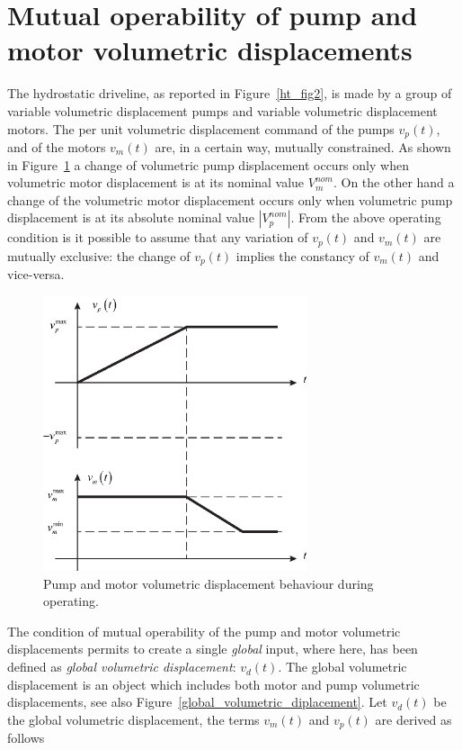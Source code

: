 \documentclass[11pt,a4paper,oneside]{book}
\numberwithin{equation}{section}
\newcommand{\abs}[1]{\left|#1\right|}
\theoremstyle{it}
\theoremstyle{definition}
\begin{document}
\section{Mutual operability of pump and motor volumetric displacements}\label{hds_theory_1}
\begin{multicols}{2}
	The hydrostatic driveline, as reported in Figure~\ref{ht_fig2}, is made by 
	a group of variable volumetric displacement pumps and variable volumetric 
	displacement motors. The per unit volumetric displacement command of the 
	pumps $v_p(t)$, and of the motors $v_m(t)$ are, in a certain way, mutually 
	constrained. As shown in Figure~\ref{ht_fig3} a change of volumetric pump 
	displacement occurs only when volumetric motor displacement is at its 
	nominal value $V_m^{nom}$. On the other hand a change of the volumetric 
	motor displacement occurs only when volumetric pump displacement is at its 
	absolute nominal value $\abs{V_p^{nom}}$. From the above operating 
	condition is it possible to assume that any variation of $v_p(t)$ and 
	$v_m(t)$ are mutually exclusive: the change of $v_p(t)$ implies the 
	constancy of $v_m(t)$ and vice-versa.
	\begin{figure}[H]
		\centering
		\includegraphics[width = 220pt, angle = 0, 
		keepaspectratio]{figures/pump_and_motor_volumetric_displacements.eps}
		\captionsetup{width=0.5\textwidth}	
		\caption{Pump and motor volumetric displacement behaviour during 
		operating.}
		\label{ht_fig3}
	\end{figure}
\end{multicols}
The condition of mutual operability of the pump and motor volumetric displacements permits to create a single \textit{global} input, where here, has been defined as \textit{ global volumetric displacement}: $v_d(t)$. The global volumetric displacement is an object which includes both motor and pump volumetric displacements, see also Figure~\ref{global_volumetric_diplacement}. Let $v_d(t)$ be the {global} volumetric displacement, the terms $v_m(t)$ and $v_p(t)$ are derived as follows
\end{document}
